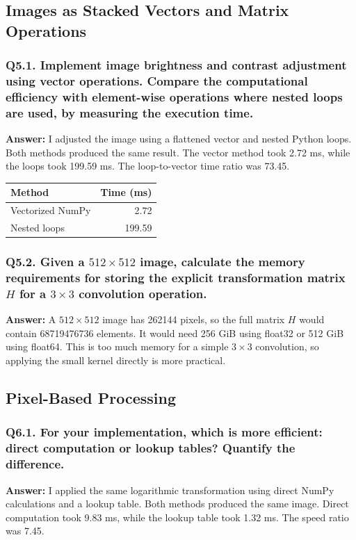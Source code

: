 \documentclass[11pt,a4paper]{article}
\begin{document}
\subsection{Images as Stacked Vectors and Matrix Operations}

\subsubsection*{Q5.1. Implement image brightness and contrast adjustment using vector operations. Compare the computational efficiency with element-wise operations where nested loops are used, by measuring the execution time.}
\textbf{Answer:} I adjusted the image using a flattened vector and nested Python loops. Both methods produced the same result. The vector method took 2.72 ms, while the loops took 199.59 ms. The loop-to-vector time ratio was 73.45.

\begin{table}[H]
\centering
\begin{tabular}{lr}
\hline
Method & Time (ms) \\
\hline
Vectorized NumPy & 2.72 \\
Nested loops & 199.59 \\
\hline
\end{tabular}
\end{table}

\subsubsection*{Q5.2. Given a \(512\times512\) image, calculate the memory requirements for storing the explicit transformation matrix \(H\) for a \(3\times3\) convolution operation.}
\textbf{Answer:} A \(512\times512\) image has 262144 pixels, so the full matrix \(H\) would contain 68719476736 elements. It would need 256 GiB using float32 or 512 GiB using float64. This is too much memory for a simple \(3\times3\) convolution, so applying the small kernel directly is more practical.

\subsection{Pixel-Based Processing}

\subsubsection*{Q6.1. For your implementation, which is more efficient: direct computation or lookup tables? Quantify the difference.}
\textbf{Answer:} I applied the same logarithmic transformation using direct NumPy calculations and a lookup table. Both methods produced the same image. Direct computation took 9.83 ms, while the lookup table took 1.32 ms. The speed ratio was 7.45.
\end{document}
